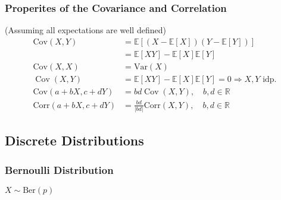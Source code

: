 \subsubsection{Properites of the Covariance and Correlation}
(Assuming all expectations are well defined)
\noindent\begin{align*}
    \mathrm{Cov}(X,Y)        & =\mathbb{E}[(X-\mathbb{E}[X])(Y-\mathbb{E}[Y])]                          \\
                             & = \mathbb{E}[XY]-\mathbb{E}[X]\mathbb{E}[Y]                              \\
    \mathrm{Cov}(X,X)        & = \mathrm{Var}(X)                                                        \\
    \operatorname{Cov}(X,Y)  & =\mathbb{E}[XY]-\mathbb{E}[X]\mathbb{E}[Y]=0 \Rightarrow X,Y\text{ idp.} \\
    \mathrm{Cov}(a+bX,c+dY)  & =bd\operatorname{Cov}(X,Y),\quad b,d\in\mathbb{R}                        \\
    \mathrm{Corr}(a+bX,c+dY) & ={\frac{bd}{|bd|}}\mathrm{Corr}(X,Y),\quad b,d\in\mathbb{R}
\end{align*}

\subsection{Discrete Distributions}

\subsubsection{Bernoulli Distribution}
$X \sim \mathrm{Ber}(p)$

